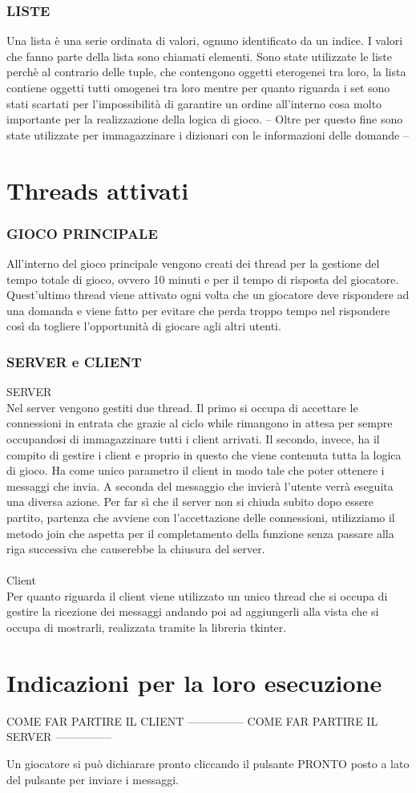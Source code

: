 \documentclass[a4paper,12pt]{report}
\begin{document}
\subsection{LISTE} 
Una lista è una serie ordinata di valori, ognuno identificato da un indice. I valori che fanno parte della lista sono chiamati elementi.
Sono state utilizzate le liste perchè al contrario delle tuple, che contengono oggetti eterogenei tra loro, la lista contiene oggetti tutti omogenei tra loro mentre per quanto riguarda i set sono stati scartati per l'impossibilità di garantire un ordine all'interno cosa molto importante per la realizzazione della logica di gioco.
-- Oltre per questo fine sono state utilizzate per immagazzinare i dizionari con le informazioni delle domande --

\chapter{Threads attivati}
\subsection{GIOCO PRINCIPALE}
All'interno del gioco principale vengono creati dei thread per la gestione del tempo totale di gioco, ovvero 10 minuti e per il tempo di risposta del giocatore. Quest'ultimo thread viene attivato ogni volta che un giocatore deve rispondere ad una domanda e viene fatto per evitare che perda troppo tempo nel rispondere così da togliere l'opportunità di giocare agli altri utenti.

\subsection{SERVER e CLIENT}
SERVER\\
Nel server vengono gestiti due thread. 
Il primo si occupa di accettare le connessioni in entrata che grazie al ciclo while rimangono in attesa per sempre occupandosi di immagazzinare tutti i client arrivati.
Il secondo, invece, ha il compito di gestire i client e proprio in questo che viene contenuta tutta la logica di gioco. Ha come unico parametro il client in modo tale che poter ottenere i messaggi che invia. A seconda del messaggio che invierà l'utente verrà eseguita una diversa azione.
Per far sì che il server non si chiuda subito dopo essere partito, partenza che avviene con l'accettazione delle connessioni, utilizziamo il metodo join che aspetta per il completamento della funzione senza passare alla riga successiva che causerebbe la chiusura del server.\\
\\
Client\\
Per quanto riguarda il client viene utilizzato un unico thread che si occupa di gestire la ricezione dei messaggi andando poi ad aggiungerli alla vista che si occupa di mostrarli, realizzata tramite la libreria tkinter.

\chapter{Indicazioni per la loro esecuzione}
COME FAR PARTIRE IL CLIENT
---------------
COME FAR PARTIRE IL SERVER
---------------

Un giocatore si può dichiarare pronto cliccando il pulsante PRONTO posto a lato del pulsante per inviare i messaggi.
\end{document}
